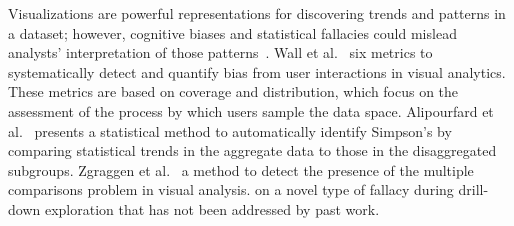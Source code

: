 Visualizations are powerful representations for discovering trends and patterns in a dataset; however, cognitive biases and statistical fallacies could mislead analysts' interpretation of those patterns~\cite{Alipourfard2018WSDM,Wall2017,Zgraggen2018CHI,Armstrong2014,Gotz2016}. Wall et al.~\cite{Wall2017}  six metrics to systematically detect and quantify bias from user interactions in visual analytics. These metrics are based on coverage and distribution, which focus on the assessment of the process by which users sample the data space. Alipourfard et al.~\cite{Alipourfard2018WSDM} presents a statistical method to automatically identify Simpson's  by comparing statistical trends in the aggregate data to those in the disaggregated subgroups. Zgraggen et al.~\cite{Zgraggen2018CHI}  a method to detect the presence of the multiple comparisons problem in visual analysis.  on a novel type of fallacy  during drill-down exploration that has not been addressed by past work. %
